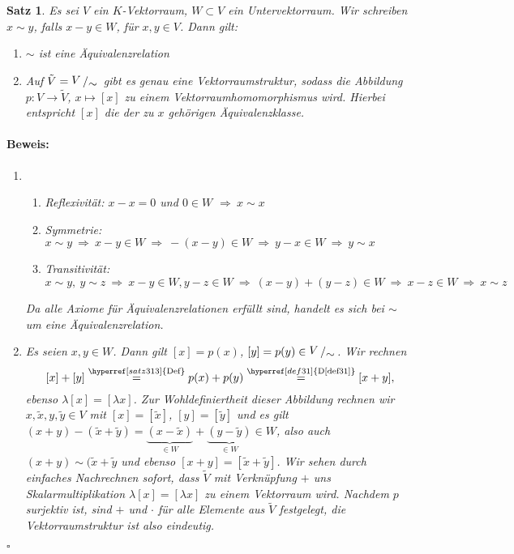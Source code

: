 \documentclass{report}
\newcommand{\lb}{\lambda}
\theoremstyle{customrem}
\theoremstyle{customdef}
\newtheorem{satz}[definition]{Satz}
\renewenvironment{proof}{\vspace{-.75cm}\paragraph{Beweis: }}{\vspace{-.5cm}\hfill$\square$}
\newcommand{\bigslant}[2]{{\raisebox{.1em}{$#1$}\left/\raisebox{-.2em}{$#2$}\right.}}
\begin{document}
	\begin{satz}
		\label{satz313}
		Es sei $V$ ein $K$-Vektorraum, $W\subset V$ ein Untervektorraum. Wir schreiben $x \sim y$, falls $x-y\in W$, für $x, y\in V$. Dann gilt:\\
		
		\begin{enumerate}
			\item[i)] $\sim$ ist eine Äquivalenzrelation
			\item[ii)] Auf $\tilde{V} = \bigslant{V}{\sim}$ gibt es genau eine Vektorraumstruktur, sodass die Abbildung $p:V\to \tilde{V}$, $x\mapsto [x]$ zu einem Vektorraumhomomorphismus wird. Hierbei entspricht $[x]$ die der zu $x$ gehörigen Äquivalenzklasse.
		\end{enumerate}
		
		\begin{proof}
			\begin{enumerate}
				\item[i)]
					\begin{enumerate}
						\item \textit{Reflexivität}: $x-x=0$ und $0\in W$ $\Rightarrow\ x\sim x$
						\item \textit{Symmetrie}: $x\sim y\ \Rightarrow\ x-y\in W\ \Rightarrow\ -(x-y)\in W\ \Rightarrow\ y-x\in W\ \Rightarrow\ y\sim x$
						\item \textit{Transitivität}: $x\sim y,\ y\sim z\ \Rightarrow\ x-y\in W, y-z\in W\ \Rightarrow\ (x-y)+(y-z)\in W\ \Rightarrow\ x-z\in W\ \Rightarrow\ x\sim z$
					\end{enumerate}
					Da alle Axiome für Äquivalenzrelationen erfüllt sind, handelt es sich bei $\sim$ um eine Äquivalenzrelation.
				\item[ii)] Es seien $x,y\in W$. Dann gilt $[x]=p(x)$, $[y] = p(y)\in \bigslant{V}{\sim}$. Wir rechnen 
				$$[x] + [y] \stackrel{\hyperref[satz313]{\text{Def}}}{=} p(x)+ p(y) \stackrel{\hyperref[def31]{\text{D\ref{def31}}}}{=} [x+y],$$
				ebenso $\lb[x] = [\lb x]$. Zur Wohldefiniertheit dieser Abbildung rechnen wir $x, \tilde{x}, y, \tilde{y}\in V$ mit $[x]=[\tilde{x}]$, $[y]=[\tilde{y}]$ und es gilt $(x+y)-(\tilde{x}+\tilde{y}) = \underbrace{(x-\tilde{x})}_{\in W} + \underbrace{(y-\tilde{y})}_{\in W}\in W$, also auch $(x+y)\sim (\tilde{x}+\tilde{y}$ und ebenso $[x+y] = [\tilde{x}+\tilde{y}]$. Wir sehen durch einfaches Nachrechnen sofort, dass $\tilde{V}$ mit Verknüpfung $+$ uns Skalarmultiplikation $\lb[x] = [\lb x]$ zu einem Vektorraum wird.
				Nachdem $p$ surjektiv ist, sind $+$ und $\cdot$ für alle Elemente aus $\tilde{V}$ festgelegt, die Vektorraumstruktur ist also eindeutig.
			\end{enumerate}
		\end{proof}
	\end{satz}
	
\end{document}

